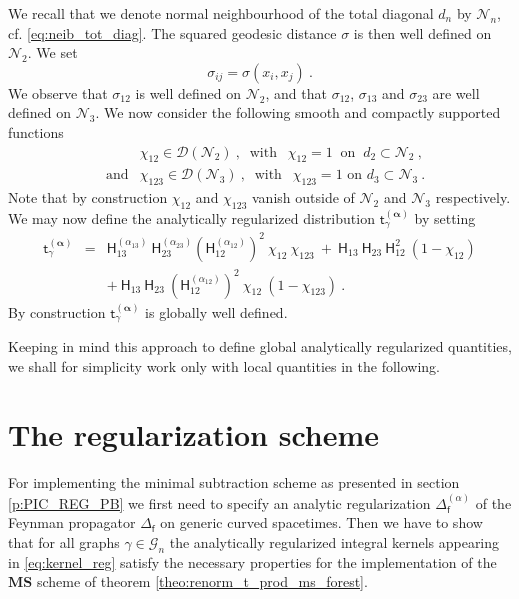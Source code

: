 \documentclass[11pt]{book}
\newcommand{\MS}{\textbf{MS}}
\newcommand{\alphabd}{\boldsymbol{\alpha}}
\newcommand{\Dcal}{\mathcal{D}}
\newcommand{\Gcal}{\mathcal{G}}
\newcommand{\Ncal}{\mathcal{N}}
\newcommand{\Hsf}{\mathsf{H}}
\newcommand{\fsf}{\mathsf{f}}
\newcommand{\tsf}{\mathsf{t}}
\theoremstyle{break}
\begin{document}
We recall that we denote normal neighbourhood of the total diagonal $d_n$ by $\Ncal_n$, cf. \eqref{eq:neib_tot_diag}. The squared geodesic distance $\sigma$ is then well defined on $\mathcal{N}_{2}$. We set 
%
\begin{equation*}
\sigma_{ij} = \sigma(x_i,x_j) \ .
\end{equation*}
%
We observe that $\sigma_{12}$ is well defined on $\Ncal_{2}$, and that $\sigma_{12}$, $\sigma_{13}$ and $\sigma_{23}$ are well defined on $\Ncal_{3}$. We now consider the following smooth and compactly supported functions
%
\begin{eqnarray*}
&& \chi_{12} \in \Dcal(\Ncal_{2}) \ , \ \mbox{ with } \ \ \chi_{12} = 1 \ \mbox{ on } \ d_2 \subset \Ncal_{2} \ , \\[6pt]
&\mbox{and}& \chi_{123} \in \Dcal(\Ncal_{3}) \ , \ \mbox{ with } \ \ \chi_{123} = 1 \mbox{ on } d_3 \subset \Ncal_{3} \ . 
\end{eqnarray*}
%
Note that by construction $\chi_{12}$ and $\chi_{123}$ vanish outside of $\Ncal_{2}$ and $\Ncal_{3}$ respectively. We may now define the analytically regularized distribution $\tsf^{(\alphabd)}_\gamma$ by setting
%
\begin{eqnarray}
\tsf^{(\alphabd)}_\gamma &=& \Hsf^{(\alpha_{13})}_{13} \ \Hsf^{(\alpha_{23})}_{23} \left(\Hsf^{(\alpha_{12})}_{12}\right)^2 \ \chi_{12} \ \chi_{123} \ + \ \Hsf_{13} \ \Hsf_{23} \ \Hsf_{12}^2 \ (1-\chi_{12}) \nonumber \\[3pt]
&& + \ \Hsf_{13} \ \Hsf_{23} \ \left(\Hsf^{(\alpha_{12})}_{12}\right)^2 \ \chi_{12} \ (1-\chi_{123}) \ .
\label{eq:kernel_reg_glob}
\end{eqnarray}
%
By construction $\tsf^{(\alphabd)}_\gamma$ is globally well defined.


Keeping in mind this approach to define global analytically regularized quantities, we shall for simplicity work only with local quantities in the following.


\section{The regularization scheme}


For implementing the minimal subtraction scheme as presented in section \ref{p:PIC_REG_PB} we first need to specify an analytic regularization $\Delta^{(\alpha)}_\fsf$ of the Feynman propagator $\Delta_\fsf$ on generic curved spacetimes. Then we have to show that for all graphs $\gamma \in \Gcal_n$ the analytically regularized integral kernels appearing in \eqref{eq:kernel_reg} satisfy the necessary properties for the implementation of the $\MS$ scheme of theorem \ref{theo:renorm_t_prod_ms_forest}. 
\end{document}
